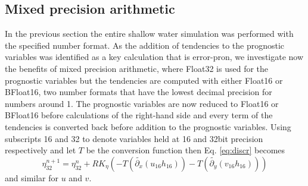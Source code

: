 \documentclass[draft]{agujournal2019}
\begin{document}
\subsection{Mixed precision arithmetic}
\label{sec:mixed}

In the previous section the entire shallow water simulation was performed with the specified number format. As the addition of tendencies to the prognostic variables was identified as a key calculation that is error-pron, we investigate now the benefits of mixed precision arithmetic, where Float32 is used for the prognostic variables but the tendencies are computed with either Float16 or BFloat16, two number formats that have the lowest decimal precision for numbers around 1. The prognostic variables are now reduced to Float16 or BFloat16 before calculations of the right-hand side and every term of the tendencies is converted back before addition to the prognostic variables. Using subscripts 16 and 32 to denote variables held at 16 and 32bit precision respectively and let $T$ be the conversion function then Eq. \ref{eq:discr} becomes
\begin{equation}
\eta_{32}^{n+1} = \eta_{32}^n + RK_{\eta}\left( - T(\tilde{\partial_x}(u_{16}h_{16})) - T(\tilde{\partial_y}(v_{16}h_{16}))\right)
\label{eq:conversion}
\end{equation}
and similar for $u$ and $v$.
\end{document}
